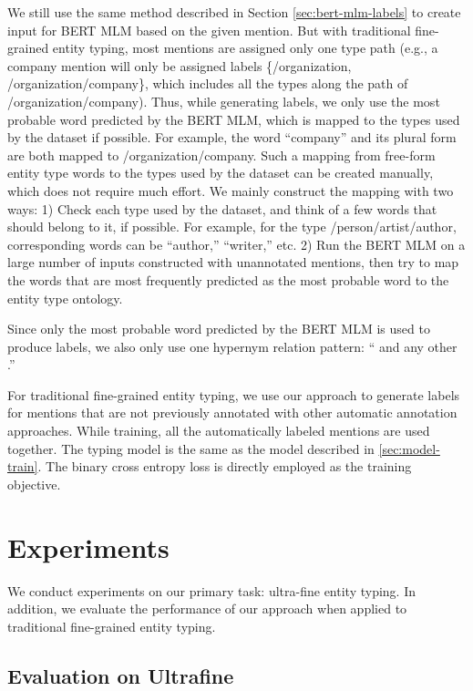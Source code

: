 \documentclass[11pt,a4paper]{article}
\begin{document}
We still use the same method described in Section \ref{sec:bert-mlm-labels} to create input for BERT MLM based on the given mention. But with traditional fine-grained entity typing, most mentions are assigned only one type path (e.g., a company mention will only be assigned labels \{/organization, /organization/company\}, which includes all the types along the path of /organization/company). Thus, while generating labels, we only use the most probable word predicted by the BERT MLM, which is mapped to the types used by the dataset if possible. For example, the word ``company'' and its plural form are both mapped to /organization/company. Such a mapping from free-form entity type words to the types used by the dataset can be created manually, which does not require much effort. We mainly construct the mapping with two ways: 1) Check each type used by the dataset, and think of a few words that should belong to it, if possible. For example, for the type /person/artist/author, corresponding words can be ``author,'' ``writer,'' etc. 2) Run the BERT MLM on a large number of inputs constructed with unannotated mentions, then try to map the words that are most frequently predicted as the most probable word to the entity type ontology.

Since only the most probable word predicted by the BERT MLM is used to produce labels, we also only use one hypernym relation pattern: `` and any other .''

For traditional fine-grained entity typing, we use our approach to generate labels for mentions that are not previously annotated with other automatic annotation approaches. While training, all the automatically labeled mentions are used together. The typing model is the same as the model described in \ref{sec:model-train}. The binary cross entropy loss is directly employed as the training objective.

\section{Experiments}
\label{sec:experiments}

We conduct experiments on our primary task: ultra-fine entity typing. In addition, we evaluate the performance of our approach when applied to traditional fine-grained entity typing.

\subsection{Evaluation on Ultrafine}
\end{document}
